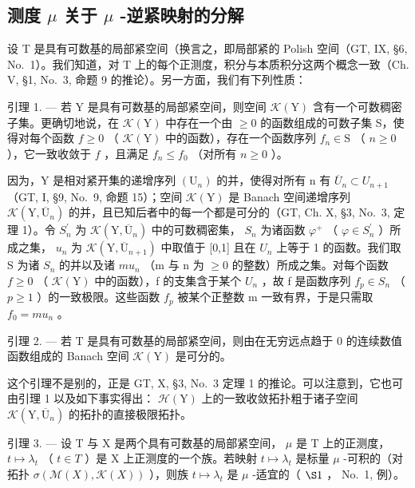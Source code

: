 \subsection{\texorpdfstring{测度 \(\mu\) 关于 \(\mu\) -逆紧映射的分解}{测度 mu 关于 mu -逆紧映射的分解}}

设 T 是具有可数基的局部紧空间（换言之，即局部紧的 Polish 空间（GT, IX, §6, No.~1）。我们知道，对 T 上的每个正测度，积分与本质积分这两个概念一致（Ch. V, §1, No.~3, 命题 9 的推论）。另一方面，我们有下列性质：

引理 1. --- 若 Y 是具有可数基的局部紧空间，则空间 \(\mathcal{K}(\mathrm{Y})\) 含有一个可数稠密子集。更确切地说，在 \(\mathcal{K}(\mathrm{Y})\) 中存在一个由 \(\geqslant 0\) 的函数组成的可数子集 S，使得对每个函数 \(f \geqslant 0\) （ \(\mathcal{K}(\mathrm{Y})\) 中的函数），存在一个函数序列 \(f_n \in \mathrm{S}\) （ \(n \geqslant 0\) ），它一致收敛于 \(f\) ，且满足 \(f_n \leqslant f_0\) （对所有 \(n \geqslant 0\) ）。

因为，Y 是相对紧开集的递增序列 \((\mathrm{U}_{n})\) 的并，使得对所有 n 有 \(\overline{U}_{n} \subset U_{n+1}\) （GT, I, §9, No.~9, 命题 15）；空间 \(\mathcal{K}(\mathrm{Y})\) 是 Banach 空间递增序列 \(\mathcal{K}(\mathrm{Y}, \overline{\mathrm{U}}_{n})\) 的并，且已知后者中的每一个都是可分的（GT, Ch. X, §3, No.~3, 定理 1）。令 \(S_{n}^{\prime}\) 为 \(\mathcal{K}(\mathrm{Y}, \overline{\mathrm{U}}_{n})\) 中的可数稠密集， \(S_{n}\) 为诸函数 \(\varphi^{+}\) （ \(\varphi \in S_{n}^{\prime}\) ）所成之集， \(u_{n}\) 为 \(\mathcal{K}(\mathrm{Y}, \overline{\mathrm{U}}_{n+1})\) 中取值于 {[}0,1{]} 且在 \(U_{n}\) 上等于 1 的函数。我们取 S 为诸 \(S_{n}\) 的并以及诸 \(mu_{n}\) （m 与 n 为 \(\geqslant 0\) 的整数）所成之集。对每个函数 \(f \geqslant 0\) （ \(\mathcal{K}(\mathrm{Y})\) 中的函数），f 的支集含于某个 \(U_{n}\) ，故 f 是函数序列 \(f_{p} \in S_{n}\) （ \(p \geqslant 1\) ）的一致极限。这些函数 \(f_{p}\) 被某个正整数 m 一致有界，于是只需取 \(f_{0} = mu_{n}\) 。

引理 2. --- 若 T 是具有可数基的局部紧空间，则由在无穷远点趋于 0 的连续数值函数组成的 Banach 空间 \(\mathcal{K}(\mathrm{Y})\) 是可分的。

这个引理不是别的，正是 GT, X, §3, No.~3 定理 1 的推论。可以注意到，它也可由引理 1 以及如下事实得出： \(\mathcal{H}(\mathrm{Y})\) 上的一致收敛拓扑粗于诸子空间 \(\mathcal{K}(\mathrm{Y},\overline{\mathrm{U}}_n)\) 的拓扑的直接极限拓扑。

引理 3. --- 设 T 与 X 是两个具有可数基的局部紧空间， \(\mu\) 是 T 上的正测度， \(t \mapsto \lambda_{t}\) （ \(t \in T\) ）是 X 上正测度的一个族。若映射 \(t \mapsto \lambda_{t}\) 是标量 \(\mu\) -可积的（对拓扑 \(\sigma(\mathcal{M}(X), \mathcal{K}(X))\) ），则族 \(t \mapsto \lambda_{t}\) 是 \(\mu\) -适宜的（ \(\S1\) ， No.~1, 例）。

